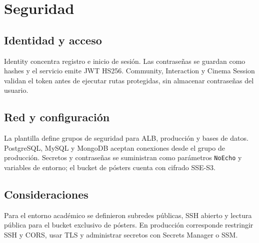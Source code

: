 \chapter{Seguridad}
\section{Identidad y acceso}
Identity concentra registro e inicio de sesión. Las contraseñas se guardan como hashes y el servicio emite JWT HS256. Community, Interaction y Cinema Session validan el token antes de ejecutar rutas protegidas, sin almacenar contraseñas del usuario.
\section{Red y configuración}
La plantilla define grupos de seguridad para ALB, producción y bases de datos. PostgreSQL, MySQL y MongoDB aceptan conexiones desde el grupo de producción. Secretos y contraseñas se suministran como parámetros \texttt{NoEcho} y variables de entorno; el bucket de pósters cuenta con cifrado SSE-S3.
\section{Consideraciones}
Para el entorno académico se definieron subredes públicas, SSH abierto y lectura pública para el bucket exclusivo de pósters. En producción corresponde restringir SSH y CORS, usar TLS y administrar secretos con Secrets Manager o SSM.

